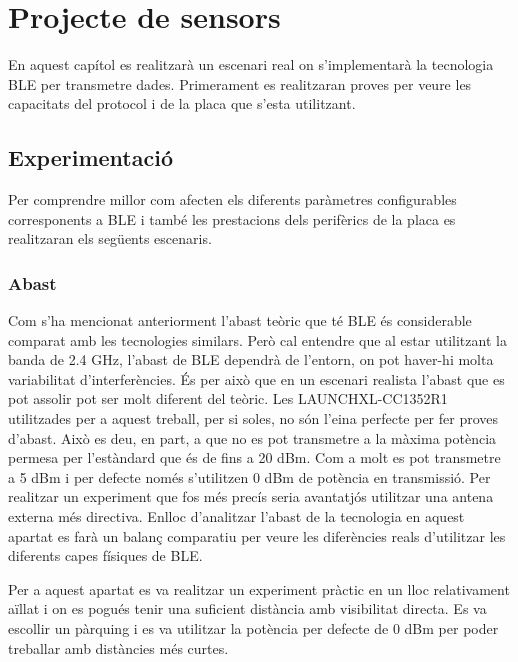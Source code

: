 \chapter{Projecte de sensors}
En aquest capítol es realitzarà un escenari real on s'implementarà la tecnologia BLE per transmetre dades.
Primerament es realitzaran proves per veure les capacitats del protocol i de la placa que s'esta utilitzant.

\section{Experimentació}
Per comprendre millor com afecten els diferents paràmetres configurables corresponents a BLE i també les prestacions dels perifèrics de la placa es realitzaran els següents escenaris.


\subsection{Abast}

Com s'ha mencionat anteriorment l'abast teòric que té BLE és considerable comparat amb les tecnologies similars.
Però cal entendre que al estar utilitzant la banda de 2.4 GHz, l'abast de BLE dependrà de l'entorn, on pot haver-hi molta variabilitat d'interferències.
És per això que en un escenari realista l'abast que es pot assolir pot ser molt diferent del teòric.
Les LAUNCHXL-CC1352R1 utilitzades per a aquest treball, per si soles, no són l'eina perfecte per fer proves d'abast.
Això es deu, en part, a que no es pot transmetre a la màxima potència permesa per l'estàndard que és de fins a 20 dBm.
Com a molt es pot transmetre a 5 dBm i per defecte només s'utilitzen 0 dBm de potència en transmissió.
Per realitzar un experiment que fos més precís seria avantatjós utilitzar una antena externa més directiva.
Enlloc d'analitzar l'abast de la tecnologia en aquest apartat es farà un balanç comparatiu per veure les diferències reals d'utilitzar les diferents capes físiques de BLE.

Per a aquest apartat es va realitzar un experiment pràctic en un lloc relativament aïllat i on es pogués tenir una suficient distància amb visibilitat directa.
Es va escollir un pàrquing i es va utilitzar la potència per defecte de 0 dBm per poder treballar amb distàncies més curtes.

